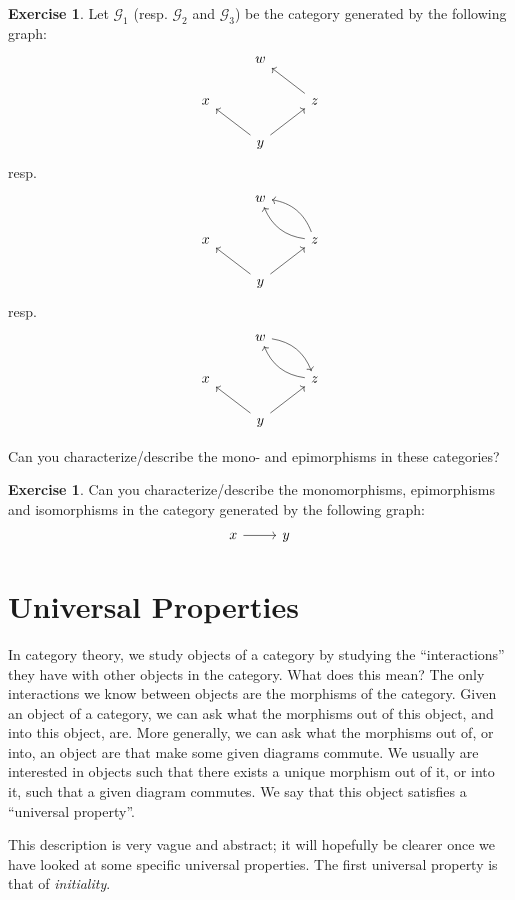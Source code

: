 \documentclass[a4paper,11pt, oneside,titlepage=false]{scrbook}
\theoremstyle{plain}
\theoremstyle{definition}
\newtheorem{exer}[thm]{Exercise}
\begin{document}
\begin{exer} Let $\mathcal{G}_1$ (resp. $\mathcal{G}_2$ and $\mathcal{G}_3$) be the category generated by the following graph:
\[
\begin{tikzcd}
& w & \\
x & & z \arrow[lu] \\
& y \arrow[lu] \arrow[ru] &
\end{tikzcd}
\]
resp.
\[
\begin{tikzcd}
& w & \\
x & & z \arrow[lu, bend left] \arrow[lu,bend right] \\
& y \arrow[lu] \arrow[ru] &
\end{tikzcd}
\]
resp.
\[
\begin{tikzcd}
& w \arrow[rd,bend left] & \\
x & & z \arrow[lu, bend left] \\
& y \arrow[lu] \arrow[ru] &
\end{tikzcd}
\]

Can you characterize/describe the mono- and epimorphisms in these categories?
\end{exer}

\begin{exer} Can you characterize/describe the monomorphisms, epimorphisms and isomorphisms in the category generated by the following graph:
\[
\begin{tikzcd}
x \arrow[r] & y
\end{tikzcd}
\]
\end{exer}

\chapter{Universal Properties}\label{sec:universal}

In category theory, we study objects of a category by studying the ``interactions'' they have with other objects in the category.
What does this mean?
The only interactions we know between objects are the morphisms of the category.
Given an object of a category, we can ask what the morphisms out of this object, and into this object, are.
More generally, we can ask what the morphisms out of, or into, an object are that make some given diagrams commute.
We usually are interested in objects such that there exists a unique morphism out of it, or into it, such that a given diagram commutes.
We say that this object satisfies a ``universal property''.

This description is very vague and abstract; it will hopefully be clearer once we have looked at some specific universal properties.
The first universal property is that of \emph{initiality}.
\end{document}
